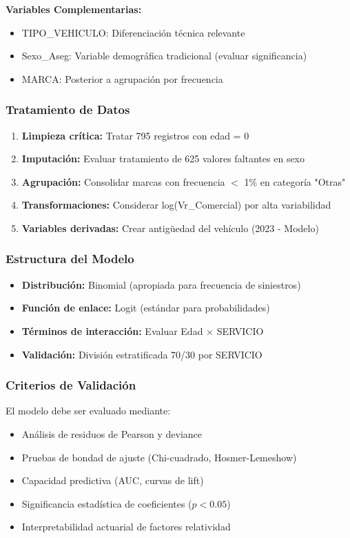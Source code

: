 \textbf{Variables Complementarias:}
\begin{itemize}
\item TIPO\_VEHICULO: Diferenciación técnica relevante
\item Sexo\_Aseg: Variable demográfica tradicional (evaluar significancia)
\item MARCA: Posterior a agrupación por frecuencia
\end{itemize}

\subsubsection{Tratamiento de Datos}

\begin{enumerate}
\item \textbf{Limpieza crítica:} Tratar 795 registros con edad = 0
\item \textbf{Imputación:} Evaluar tratamiento de 625 valores faltantes en sexo
\item \textbf{Agrupación:} Consolidar marcas con frecuencia $<$ 1\% en categoría "Otras"
\item \textbf{Transformaciones:} Considerar log(Vr\_Comercial) por alta variabilidad
\item \textbf{Variables derivadas:} Crear antigüedad del vehículo (2023 - Modelo)
\end{enumerate}

\subsubsection{Estructura del Modelo}

\begin{itemize}
\item \textbf{Distribución:} Binomial (apropiada para frecuencia de siniestros)
\item \textbf{Función de enlace:} Logit (estándar para probabilidades)
\item \textbf{Términos de interacción:} Evaluar Edad $\times$ SERVICIO
\item \textbf{Validación:} División estratificada 70/30 por SERVICIO
\end{itemize}

\subsubsection{Criterios de Validación}

El modelo debe ser evaluado mediante:
\begin{itemize}
\item Análisis de residuos de Pearson y deviance
\item Pruebas de bondad de ajuste (Chi-cuadrado, Hosmer-Lemeshow)
\item Capacidad predictiva (AUC, curvas de lift)
\item Significancia estadística de coeficientes ($p < 0.05$)
\item Interpretabilidad actuarial de factores relatividad
\end{itemize}

